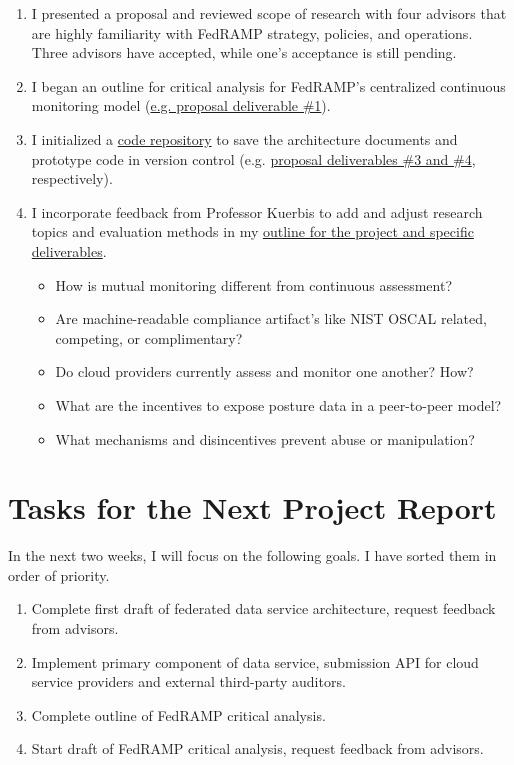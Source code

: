 \documentclass{jdf}
\begin{document}
\begin{enumerate}
    \item I presented a proposal and reviewed scope of research with four advisors that are highly familiarity with FedRAMP strategy, policies, and operations. Three advisors have accepted, while one's acceptance is still pending.
    \item I began an outline for critical analysis for FedRAMP's centralized continuous monitoring model (\hyperlink{https://github.com/aj-stein/practicum_proposal/blob/main/paper.pdf}{e.g. proposal deliverable \#1}).
    \item I initialized a \hyperlink{https://github.com/aj-stein/conmotion.git}{code repository} to save the architecture documents and prototype code in version control (e.g. \hyperlink{https://github.com/aj-stein/practicum_proposal/blob/main/paper.pdf}{proposal deliverables \#3 and \#4}, respectively).
    \item I incorporate feedback from Professor Kuerbis to add and adjust research topics and evaluation methods in my \hyperlink{https://github.com/aj-stein/practicum/blob/main/notes.pdf}{outline for the project and specific deliverables}.
    \begin{itemize}
        \item How is mutual monitoring different from continuous assessment?
        \item Are machine-readable compliance artifact's like NIST OSCAL related, competing, or complimentary?
        \item Do cloud providers currently assess and monitor one another? How?
        \item What are the incentives to expose posture data in a peer-to-peer model?
        \item What mechanisms and disincentives prevent abuse or manipulation?
    \end{itemize}
\end{enumerate}

\section*{Tasks for the Next Project Report}

In the next two weeks, I will focus on the following goals. I have sorted them in order of priority.

\begin{enumerate}
    \item Complete first draft of federated data service architecture, request feedback from advisors.
    \item Implement primary component of data service, submission API for cloud service providers and external third-party auditors.
    \item Complete outline of FedRAMP critical analysis.
    \item Start draft of FedRAMP critical analysis, request feedback from advisors.
\end{enumerate}
\end{document}

